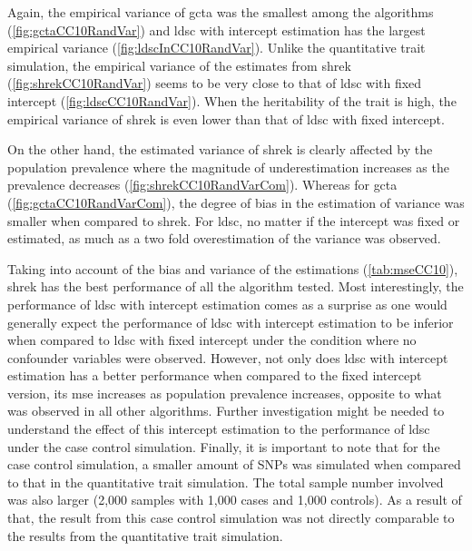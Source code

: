 		Again, the empirical variance of \gls{gcta} was the smallest among the algorithms (\cref{fig:gctaCC10RandVar}) and \gls{ldsc} with intercept estimation has the largest empirical variance (\cref{fig:ldscInCC10RandVar}). 
		Unlike the quantitative trait simulation, the empirical variance of the estimates from \gls{shrek} (\cref{fig:shrekCC10RandVar}) seems to be very close to that of \gls{ldsc} with fixed intercept (\cref{fig:ldscCC10RandVar}).
		When the heritability of the trait is high, the empirical variance of \gls{shrek} is even lower than that of \gls{ldsc} with fixed intercept. 
		
		On the other hand, the estimated variance of \gls{shrek} is clearly affected by the population prevalence where the magnitude of underestimation increases as the prevalence decreases (\cref{fig:shrekCC10RandVarCom}).
		Whereas for \gls{gcta} (\cref{fig:gctaCC10RandVarCom}), the degree of bias in the estimation of variance was smaller when compared to \gls{shrek}.
		For \gls{ldsc}, no matter if the intercept was fixed or estimated, as much as a two fold overestimation of the variance was observed. 
		
		Taking into account of the bias and variance of the estimations (\cref{tab:mseCC10}), \gls{shrek} has the best performance of all the algorithm tested.
		Most interestingly, the performance of \gls{ldsc} with intercept estimation comes as a surprise as one would generally expect the performance of \gls{ldsc} with intercept estimation to be inferior when compared to \gls{ldsc} with fixed intercept under the condition where no confounder variables were observed.
		However, not only does \gls{ldsc} with intercept estimation has a better performance when compared to the fixed intercept version, its \gls{mse} increases as population prevalence increases, opposite to what was observed in all other algorithms.
		Further investigation might be needed to understand the effect of this intercept estimation to the performance of \gls{ldsc} under the case control simulation.
		Finally, it is important to note that for the case control simulation, a smaller amount of \glspl{SNP} was simulated when compared to that in the quantitative trait simulation. 
		The total sample number involved was also larger (2,000 samples with 1,000 cases and 1,000 controls).
		As a result of that, the result from this case control simulation was not directly comparable to the results from the quantitative trait simulation.
		
